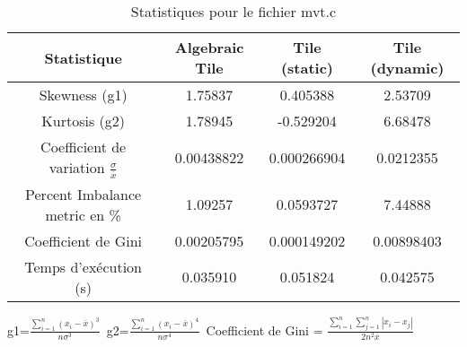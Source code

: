 \documentclass{article}
\begin{document}
\begin{table}[htbp]
  \centering
  \caption{Statistiques pour le fichier mvt.c}
  \begin{tabular}{|c|c|c|c|}
    \hline
    Statistique & Algebraic Tile & Tile (static) & Tile (dynamic) \\ 
    \hline
    Skewness (g1)  & 1.75837 & 0.405388 & 2.53709 \\ 
    Kurtosis (g2)  & 1.78945 & -0.529204 & 6.68478 \\ 
    Coefficient de variation $ \frac{\sigma}{\overline{x}} $ & 0.00438822 & 0.000266904 & 0.0212355\\ 
    Percent Imbalance metric en \% & 1.09257 & 0.0593727 & 7.44888\\ 
    Coefficient de Gini  & 0.00205795 & 0.000149202 & 0.00898403\\ 
    Temps d'exécution (s) &  0.035910    &  0.051824   &  0.042575   \\ 

    \hline
  \end{tabular}
\end{table}\newline
g1=$ \frac{\sum_{i=1}^{n} (x_i - \overline{x})^3}{n\sigma^3} $\
g2=$ \frac{\sum_{i=1}^{n} (x_i - \overline{x})^4}{n\sigma^4} $\
Coefficient de Gini = $ \frac{\sum_{i=1}^{n}\sum_{j=1}^{n} |x_i - x_j|}{2n^2\overline{x}} $\
\newpage
\end{document}
